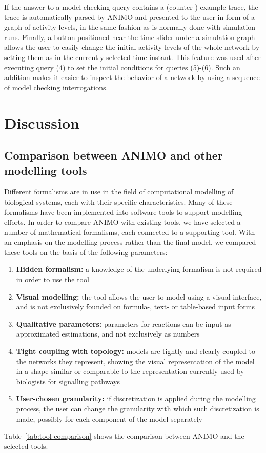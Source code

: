 \documentclass{bmcart}
\begin{document}
If the answer to a model checking query contains a (counter-) example trace, the trace
is automatically parsed by ANIMO and presented to the user in form of a graph of activity levels, in the same fashion
as is normally done with simulation runs.
Finally, a button positioned near the time slider under a simulation graph allows the user to easily change
the initial activity levels of the whole network by setting them as in the currently selected time instant.
This feature was used after executing query (4) to set the initial conditions for queries (5)-(6).
Such an addition makes it easier to inspect the behavior of a network by using a sequence of model checking interrogations.






\section*{Discussion}


\subsection*{Comparison between ANIMO and other modelling tools}\label{suppl:comparison-table}
Different formalisms are in use in the field of computational
modelling of biological systems, each with their specific characteristics.
Many of these formalisms have been implemented into
software tools to support modelling efforts. In order to compare
ANIMO with existing tools, we have selected a number of mathematical formalisms,
each connected to a supporting tool. With an emphasis on the modelling
process rather than the final model, we compared these tools on
the basis of the following parameters:

\begin{enumerate}
  \item {\bf Hidden formalism:} a knowledge of the underlying formalism is not required in order to use the tool
  \item {\bf Visual modelling:} the tool allows the user to model using a visual interface, and is not exclusively
      founded on formula-, text- or table-based input forms
  \item {\bf Qualitative parameters:} parameters for reactions can be input as approximated estimations, and not exclusively as numbers
  \item {\bf Tight coupling with topology:} models are tightly and clearly coupled to the networks they represent, showing the visual
      representation of the model in a shape similar or comparable to the representation currently used by biologists
      for signalling pathways
  \item {\bf User-chosen granularity:} if discretization is applied during the modelling process, the user can change the granularity
      with which such discretization is made, possibly for each component of the model separately
\end{enumerate}
Table~\ref{tab:tool-comparison} shows the comparison between ANIMO and the selected tools.
\end{document}
